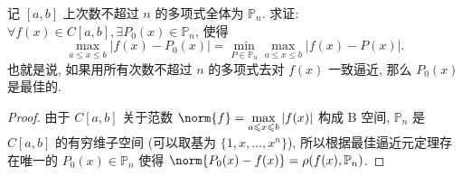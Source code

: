 \problem[1.4.8] 记 $[a,b]$ 上次数不超过 $n$ 的多项式全体为 $\mathbb{P}_n$. 求证:
$\forall f(x) \in C[a,b], \exists P_0(x) \in \mathbb{P}_n$, 使得
\[ \max_{a \leqslant x \leqslant b} |f(x) - P_0(x)| = \min_{P \in \mathbb{P}_n} \max_{a \leqslant x \leqslant b} |f(x) - P(x)|.
\]
也就是说, 如果用所有次数不超过 $n$ 的多项式去对 $f(x)$ 一致逼近, 那么 $P_0(x)$ 是最佳的.

\begin{proof}
	由于 $C[a,b]$ 关于范数 $\norm{f}=\max\limits_{a\leqslant x\leqslant b}|f(x)|$ 构成 B 空间, $\mathbb P_n$ 是 $C[a,b]$ 的有穷维子空间 (可以取基为 $\{1,x,\ldots,x^n\}$), 所以根据最佳逼近元定理存在唯一的 $P_0(x)\in\mathbb P_n$ 使得 $\norm{P_0(x)-f(x)}=\rho(f(x),\mathbb P_n)$.
\end{proof}